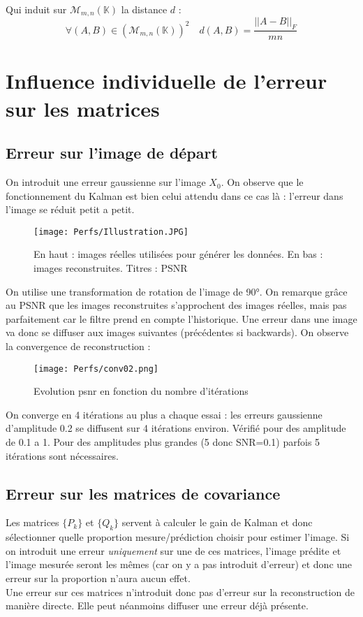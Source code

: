 \documentclass[titlepage]{article}
\newcommand{\fnorm}[1]{|\vert#1|\vert_{F}} %
\begin{document}
	Qui induit sur $\mathcal{M}_{m,n}(\mathbb{K})$ la distance $d$ :
	$$
		\forall(A,B)\in\left(\mathcal{M}_{m,n}(\mathbb{K})\right)^2\quad d(A,B) = \frac{\fnorm{A-B}}{mn}
	$$
	
	\newpage
	\section{Influence individuelle de l'erreur sur les matrices}
	\subsection{Erreur sur l'image de départ}
	On introduit une erreur gaussienne sur l'image $X_0$. On observe que le fonctionnement du Kalman est bien celui attendu dans ce cas là : l'erreur dans l'image se réduit petit a petit.
	
	\begin{figure}[H]
		\centering
		\texttt{[image: Perfs/Illustration.JPG]}
		\caption{En haut : images réelles utilisées pour générer les données. En bas : images reconstruites. Titres : PSNR}
	\end{figure}

	On utilise une transformation de rotation de l'image de 90°. On remarque grâce au PSNR que les images reconstruites s'approchent des images réelles, mais pas parfaitement car le filtre prend en compte l'historique. Une erreur dans une image va donc se diffuser aux images suivantes (précédentes si backwards). On observe la convergence de reconstruction :
	
	\begin{figure}[H]
		\centering
		\texttt{[image: Perfs/conv02.png]}
		\caption{Evolution psnr en fonction du nombre d'itérations}
	\end{figure}

	On converge en 4 itérations au plus a chaque essai : les erreurs gaussienne d'amplitude 0.2 se diffusent sur 4 itérations environ.
	Vérifié pour des amplitude de 0.1 a 1. Pour des amplitudes plus grandes (5 donc SNR=0.1) parfois 5 itérations sont nécessaires.
	
	\subsection{Erreur sur les matrices de covariance}
	
	Les matrices $\{P_k\}$ et $\{Q_k\}$ servent à calculer le gain de Kalman et donc sélectionner quelle proportion mesure/prédiction choisir pour estimer l'image. Si on introduit une erreur \emph{uniquement} sur une de ces matrices, l'image prédite et l'image mesurée seront les mêmes (car on y a pas introduit d'erreur) et donc une erreur sur la proportion n'aura aucun effet.\\
	Une erreur sur ces matrices n'introduit donc pas d'erreur sur la reconstruction de manière directe. Elle peut néanmoins diffuser une erreur déjà présente.
	
\end{document}

